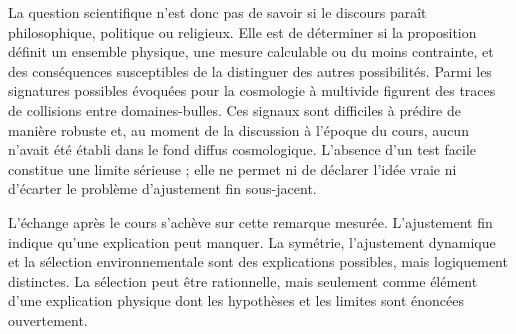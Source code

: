 La question scientifique n’est donc pas de savoir si le discours paraît philosophique, politique ou religieux. Elle est de déterminer si la proposition définit un ensemble physique, une mesure calculable ou du moins contrainte, et des conséquences susceptibles de la distinguer des autres possibilités. Parmi les signatures possibles évoquées pour la cosmologie à multivide figurent des traces de collisions entre domaines-bulles. Ces signaux sont difficiles à prédire de manière robuste et, au moment de la discussion à l’époque du cours, aucun n’avait été établi dans le fond diffus cosmologique. L’absence d’un test facile constitue une limite sérieuse ; elle ne permet ni de déclarer l’idée vraie ni d’écarter le problème d’ajustement fin sous-jacent.

\begin{classroomqa}
\end{classroomqa}

L’échange après le cours s’achève sur cette remarque mesurée. L’ajustement fin indique qu’une explication peut manquer. La symétrie, l’ajustement dynamique et la sélection environnementale sont des explications possibles, mais logiquement distinctes. La sélection peut être rationnelle, mais seulement comme élément d’une explication physique dont les hypothèses et les limites sont énoncées ouvertement.
